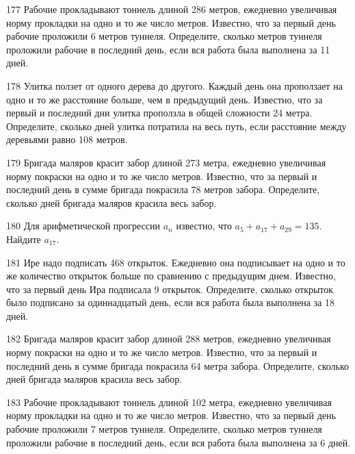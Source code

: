 \documentclass[4apaper]{article}
\begin{document}
\begin{taskBN}{177}
 Рабочие прокладывают тоннель длиной 286 метров, ежедневно увеличивая норму прокладки на одно и то же число метров. Известно, что за первый день рабочие проложили 6 метров туннеля.  Определите, сколько метров туннеля проложили рабочие в последний день, если вся работа была выполнена за 11 дней.
\end{taskBN}

\begin{taskBN}{178}
 Улитка ползет от одного дерева до другого. Каждый день она проползает на одно и то же расстояние больше, чем в предыдущий день. Известно, что за первый и последний дни улитка проползла в общей сложности 24 метра. Определите, сколько дней улитка потратила на весь путь, если расстояние между деревьями равно 108 метров.
\end{taskBN}

\begin{taskBN}{179}
 Бригада маляров красит забор длиной 273 метра, ежедневно увеличивая норму покраски на одно и то же число метров. Известно, что за первый и последний день в сумме бригада покрасила 78 метров забора.  Определите, сколько дней бригада маляров красила весь забор. 
\end{taskBN}

\begin{taskBN}{180}
Для арифметической прогрессии ${a_n}$ известно, что $a_{5} + a_{17} + a_{29}= 135$. Найдите $a_{17}$.
\end{taskBN}

\begin{taskBN}{181}
Ире надо подписать 468 открыток. Ежедневно она подписывает на одно и то же количество открыток больше по сравнению с предыдущим днем. Известно, что за первый день Ира подписала 9 открыток. Определите, сколько открыток было подписано за одиннадцатый день, если вся работа была выполнена за 18 дней.
\end{taskBN}

\begin{taskBN}{182}
 Бригада маляров красит забор длиной 288 метров, ежедневно увеличивая норму покраски на одно и то же число метров. Известно, что за первый и последний день в сумме бригада покрасила 64 метра забора.  Определите, сколько дней бригада маляров красила весь забор. 
\end{taskBN}

\begin{taskBN}{183}
 Рабочие прокладывают тоннель длиной 102 метра, ежедневно увеличивая норму прокладки на одно и то же число метров. Известно, что за первый день рабочие проложили 7 метров туннеля.  Определите, сколько метров туннеля проложили рабочие в последний день, если вся работа была выполнена за 6 дней.
\end{taskBN}
\end{document}
